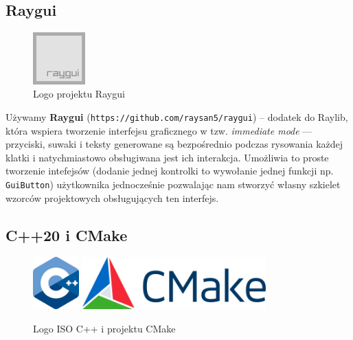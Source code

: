 \documentclass[a4paper,12pt]{article}
\begin{document}
\subsection{Raygui} 

\begin{figure}[H]
\begin{center}
  \includegraphics[height=2cm]{figures/raygui_256x256.png} 
\end{center}
\caption{Logo projektu Raygui}
\end{figure}

Używamy \textbf{Raygui} (\verb|https://github.com/raysan5/raygui|) -- dodatek do Raylib, która wspiera tworzenie interfejsu
graficznego w tzw. \emph{immediate mode} — przyciski, suwaki i teksty
generowane są bezpośrednio podczas rysowania każdej klatki i natychmiastowo
obsługiwana jest ich interakcja. Umożliwia to proste tworzenie intefejsów
(dodanie jednej kontrolki to wywołanie jednej funkcji np. \texttt{GuiButton})
użytkownika jednocześnie pozwalając nam stworzyć własny szkielet wzorców
projektowych obsługujących ten interfejs.

\subsection{C++20 i CMake}

\begin{figure}[H]
\begin{center}
  \includegraphics[height=2cm]{figures/ISO_C++_Logo.png} 
  \hspace{1cm}
  \includegraphics[height=2cm]{figures/CMake-Logo-1.png} 
\end{center}
\caption{Logo ISO C++ i projektu CMake}
\end{figure}
\end{document}
